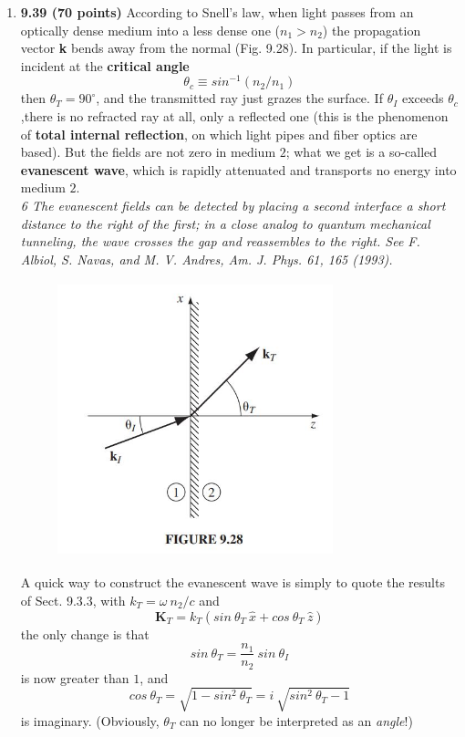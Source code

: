 \documentclass[fleqn]{article}
\begin{document}
\begin{enumerate}
    \item \textbf{9.39 (70 points)} According to Snell’s law, when light passes from an optically dense medium into a less dense one ($n_1 > n_2$) the 
    propagation vector \textbf{k} bends away from the normal (Fig. 9.28). In particular, if the light is incident at the \textbf{critical angle}
    $$
      \theta_c \equiv sin^{-1} \left(n_2/n_1\right)
    $$
    then $\theta_T=90^{\circ}$,  and the transmitted ray just grazes the surface. If $\theta_I$ exceeds $\theta_c$,there is no refracted ray at all, only a 
    reflected one (this is the phenomenon of \textbf{total internal reflection}, on which light pipes and fiber optics are based). But the fields are 
    not zero in medium $2$; what we get is a so-called \textbf{evanescent wave}, which is rapidly attenuated and transports no energy into medium $2$.
    \\
    \emph{6 The evanescent fields can be detected by placing a second interface a short distance to the right of
    the first; in a close analog to quantum mechanical tunneling, the wave crosses the gap and reassembles
    to the right. See F. Albiol, S. Navas, and M. V. Andres, Am. J. Phys. 61, 165 (1993).}

    \begin{figure}[h!]
      \centering
      \includegraphics[height=8cm, width=8cm]{figure9.28.JPG}
    \end{figure}

    A quick way to construct the evanescent wave is simply to quote the results of Sect. 9.3.3, with $k_T=\omega ~ n_2/c$ and
    $$
    \mathbf{K}_T=k_T \left(sin ~ \theta_T ~ \hat{x}+cos ~ \theta_T ~ \hat{z}\right)
    $$
    the only change is that 
    $$
      sin ~ \theta_T=\dfrac{n_1}{n_2} ~ sin ~ \theta_I
    $$
    is now greater than $1$, and 
    $$
      cos ~ \theta_T=\sqrt{1-sin^2 ~ \theta_T}=i ~ \sqrt{sin^2 ~ \theta_T-1}
    $$
    is imaginary. (Obviously, $\theta_T$ can no longer be interpreted as an \emph{angle}!)


\end{enumerate}
\end{document}
